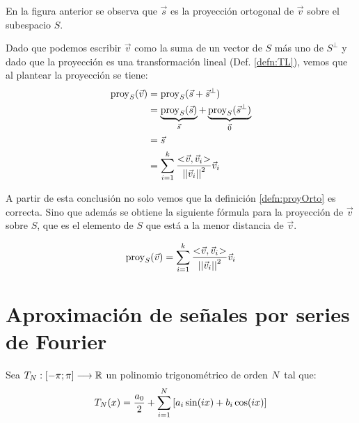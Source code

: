 \begin{center}
    \def\svgwidth{0.6\linewidth}
    
\end{center}

En la figura anterior se observa que $\Vec{s}$ es la proyección ortogonal de $\Vec{v}$ sobre el subespacio $S$.

Dado que podemos escribir $\Vec{v}$ como la suma de un vector de $S$ más uno de $S^\perp$ y dado que la proyección es una transformación lineal (Def. \ref{defn:TL}), vemos que al plantear la proyección se tiene:
\begin{align*}
    \operatorname{proy}_S(\Vec{v}) &= \operatorname{proy}_S(\Vec{s}+\Vec{s}^\perp)
    \\
    &= \underbrace{\operatorname{proy}_S(\Vec{s})}_{\Vec{s}} + \underbrace{\operatorname{proy}_S(\Vec{s}^\perp)}_{\Vec{0}}
    \\
    &= \Vec{s}
    \\
    &= \sum_{i=1}^k \frac{<\hspace{-0.8mm}\Vec{v},\Vec{v}_i\hspace{-0.8mm}>}{{\left|\left| {\Vec{v}_i} \right|\right|}^2} \Vec{v}_i
\end{align*}

A partir de esta conclusión no solo vemos que la definición \ref{defn:proyOrto} es correcta.
Sino que además se obtiene la siguiente fórmula para la proyección de $\Vec{v}$ sobre $S$, que es el elemento de $S$ que está a la menor distancia de $\Vec{v}$.

\begin{mdframed}[style=PropertyFrame]
    \begin{prop}
        \label{prop:proyOrto2}
    \end{prop}
    \begin{equation*}
        \operatorname{proy}_S(\Vec{v}) = \sum_{i=1}^k \frac{<\hspace{-0.8mm}\Vec{v},\Vec{v}_i\hspace{-0.8mm}>}{{\left|\left| {\Vec{v}_i} \right|\right|}^2} \Vec{v}_i
    \end{equation*}
\end{mdframed}


\section{Aproximación de señales por series de Fourier}

Sea $T_N: \left[-\pi;\pi\right] \longrightarrow \mathbb{R}$ un polinomio trigonométrico de orden $N$ tal que:
\begin{equation*}
    T_N(x) = \frac{a_0}{2} + \sum_{i=1}^N \left[ a_i \sin(i x) + b_i \cos(i x) \right]
\end{equation*}

